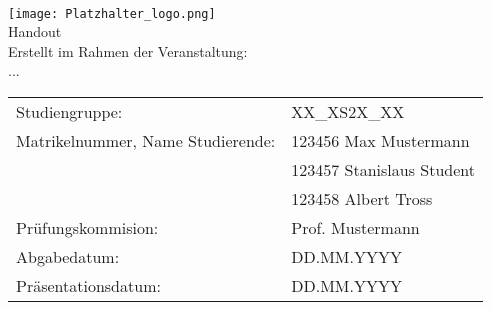 \begin{center}
     \\[3ex]
    \texttt{[image: Platzhalter\_logo.png]} \\[3ex]%
    \large{Handout} \\ [-10pt]
    \large{Erstellt im Rahmen der Veranstaltung:} \\ [-10pt]
    \large{...}
\end{center}

\renewcommand{\arraystretch}{2.5}
\begin{table}[h]
    \setlength{\tabcolsep}{22pt}
    \begin{tabularx}{\textwidth}{l l}
        Studiengruppe:                      & XX\_XS2X\_XX              \\
        Matrikelnummer, Name Studierende:   & 123456 Max Mustermann     \\ [-15pt]
        ~                                   & 123457 Stanislaus Student \\ [-15pt]
        ~                                   & 123458 Albert Tross       \\
        Prüfungskommision:                  & Prof. Mustermann          \\
        Abgabedatum:                        & DD.MM.YYYY                \\ [-15pt]
        Präsentationsdatum:                 & DD.MM.YYYY                \\
    \end{tabularx}
\end{table}

\newpage